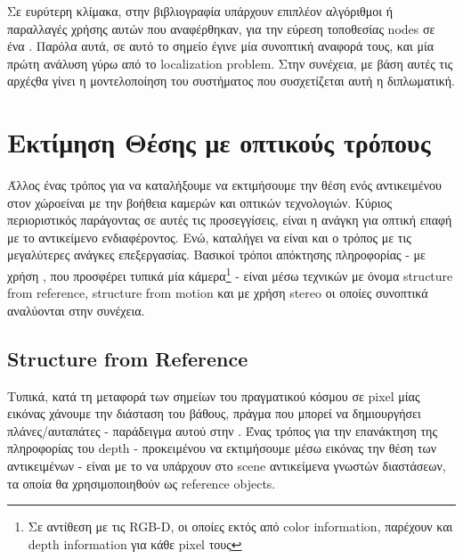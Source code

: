 
Σε ευρύτερη κλίμακα, στην βιβλιογραφία υπάρχουν επιπλέον αλγόριθμοι ή παραλλαγές χρήσης αυτών που αναφέρθηκαν, για την εύρεση τοποθεσίας
nodes σε ένα . Παρόλα αυτά, σε αυτό το σημείο έγινε μία συνοπτική αναφορά τους,  και μία πρώτη
ανάλυση γύρω από το localization problem. Στην συνέχεια,
με βάση αυτές τις αρχές\udot θα γίνει η μοντελοποίηση του συστήματος που συσχετίζεται αυτή η διπλωματική. 

\section{Εκτίμηση Θέσης με οπτικούς τρόπους} \label{chap:Image-based} %
Άλλος ένας τρόπος για να καταλήξουμε να εκτιμήσουμε την θέση ενός αντικειμένου στον χώρο\udot είναι με την βοήθεια καμερών και οπτικών τεχνολογιών. Κύριος πε\-ριο\-ρι\-στι\-κός παράγοντας σε αυτές τις προσεγγίσεις, είναι η ανάγκη για οπτική επαφή με το αντικείμενο ενδιαφέροντος. Ενώ, καταλήγει να είναι και ο τρόπος με τις μεγαλύτερες ανάγκες επεξεργασίας. Βασικοί τρόποι απόκτησης  πληροφορίας - με χρήση , που προσφέρει τυπικά μία κάμερα\footnote{Σε αντίθεση με τις RGB-D, οι οποίες εκτός από color information, παρέχουν και depth information για κάθε pixel τους} - είναι μέσω τεχνικών με όνομα structure from reference, structure from motion και με χρήση stereo \cite{location-from-image} οι οποίες συνοπτικά αναλύονται στην συνέχεια.

\subsection{Structure from Reference} \label{sec:theo-structure-from-reference}
Τυπικά, κατά τη μεταφορά των σημείων του πραγματικού κόσμου  σε pixel μίας εικόνας  χάνουμε την διάσταση του βάθους, πράγμα που μπορεί να δημιουργήσει πλάνες/αυταπάτες - παράδειγμα αυτού στην . Ένας τρόπος για την επανάκτηση της πληροφορίας του depth - προκειμένου να εκτιμήσουμε μέσω εικόνας την θέση των αντικειμένων - είναι με το να υπάρχουν στο scene αντικείμενα γνωστών διαστάσεων, τα οποία θα χρησιμοποιηθούν ως reference objects.

